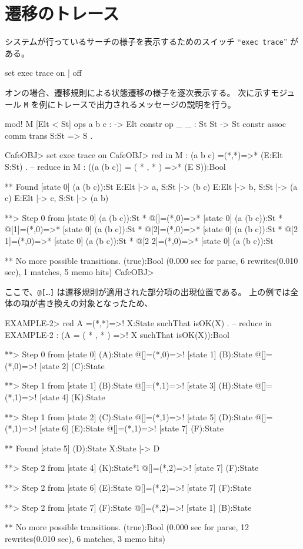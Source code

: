 \documentclass{article}
\begin{document}
\section{遷移のトレース}
\label{sec:trans-trace}
システムが行っているサーチの様子を表示するためのスイッチ
``\texttt{exec trace}'' がある。

\begin{simplev}
	set exec trace {on | off}
\end{simplev}

オンの場合、遷移規則による状態遷移の様子を逐次表示する。
次に示すモジュール \texttt{M} を例にトレースで出力されるメッセージの説明を行う。

\begin{simplev}
  mod! M {
  [Elt < St]
  ops a b c : -> Elt {constr}
  op _ _  : St St -> St {constr assoc comm}
  trans S:St => S . 
}
\end{simplev}


\begin{simplev}
CafeOBJ> set exec trace on
CafeOBJ> red in M : (a b c) =(*,*)=>* (E:Elt S:St) .
-- reduce in M : ((a (b c)) = ( * , * ) =>* (E S)):Bool

** Found [state 0] (a (b c)):St
   { E:Elt |-> a, S:St |-> (b c) }
   { E:Elt |-> b, S:St |-> (a c) }
   { E:Elt |-> c, S:St |-> (a b) }


**> Step 0 from [state 0] (a (b c)):St *
@[]=(*,0)=>* [state 0] (a (b c)):St *
@[1]=(*,0)=>* [state 0] (a (b c)):St *
@[2]=(*,0)=>* [state 0] (a (b c)):St *
@[2 1]=(*,0)=>* [state 0] (a (b c)):St *
@[2 2]=(*,0)=>* [state 0] (a (b c)):St

** No more possible transitions.
(true):Bool
(0.000 sec for parse, 6 rewrites(0.010 sec), 1 matches, 5 memo hits)
CafeOBJ> 
\end{simplev}
ここで、\texttt{@[\ldots]} は遷移規則が適用された部分項の出現位置である。
上の例では全体の項が書き換えの対象となったため、

\begin{simplev}
EXAMPLE-2> red A =(*,*)=>! X:State suchThat isOK(X) .
-- reduce in EXAMPLE-2 : (A = ( * , * ) =>! X suchThat isOK(X)):Bool

**> Step 0 from [state 0] (A):State
@[]=(*,0)=>! [state 1] (B):State
@[]=(*,0)=>! [state 2] (C):State

**> Step 1 from [state 1] (B):State
@[]=(*,1)=>! [state 3] (H):State
@[]=(*,1)=>! [state 4] (K):State

**> Step 1 from [state 2] (C):State
@[]=(*,1)=>! [state 5] (D):State
@[]=(*,1)=>! [state 6] (E):State
@[]=(*,1)=>! [state 7] (F):State

** Found [state 5] (D):State
   { X:State |-> D }


**> Step 2 from [state 4] (K):State*l
@[]=(*,2)=>! [state 7] (F):State

**> Step 2 from [state 6] (E):State
@[]=(*,2)=>! [state 7] (F):State

**> Step 2 from [state 7] (F):State
@[]=(*,2)=>! [state 1] (B):State

** No more possible transitions.
(true):Bool
(0.000 sec for parse, 12 rewrites(0.010 sec), 6 matches, 3 memo hits)
\end{simplev}
\end{document}
